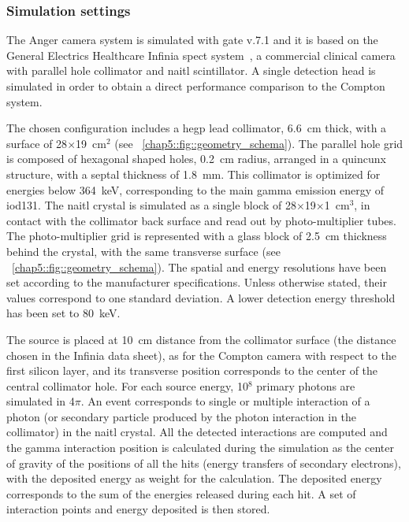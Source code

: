 \subsubsection{Simulation settings}\label{chap5::subsubsec::AC_settings}
The Anger camera system is simulated with \gls{gate} v.7.1 and it is based on the General Electrics Healthcare Infinia \gls{spect} system~\parencite{GeneralElectrics2006}, a commercial clinical camera with parallel hole collimator and \gls{naitl} scintillator. A single detection head is simulated in order to obtain a direct performance comparison to the Compton system.

The chosen configuration includes a \gls{hegp} lead collimator, 6.6~cm thick, with a surface of 28$\times$19~cm$^{2}$ (see \figurename~\ref{chap5::fig::geometry_schema}). The parallel hole grid is composed of hexagonal shaped holes, 0.2~cm radius, arranged in a quincunx structure, with a septal thickness of 1.8~mm. This collimator is optimized for energies below 364~keV, corresponding to the main gamma emission energy of \gls{iod131}. The \gls{naitl} crystal is simulated as a single block of 28$\times$19$\times$1~cm$^{3}$, in contact with the collimator back surface and read out by photo-multiplier tubes. The photo-multiplier grid is represented with a glass block of 2.5~cm thickness behind the crystal, with the same transverse surface (see \figurename~\ref{chap5::fig::geometry_schema}). The spatial and energy resolutions have been set according to the manufacturer specifications. Unless otherwise stated, their values correspond to one standard deviation. A lower detection energy threshold has been set to 80~keV.

The source is placed at 10~cm distance from the collimator surface (the distance chosen in the Infinia data sheet), as for the Compton camera with respect to the first silicon layer, and its transverse position corresponds to the center of the central collimator hole. For each source energy, 10$^{8}$ primary photons are simulated in 4$\pi$. An event corresponds to single or multiple interaction of a photon (or secondary particle produced by the photon interaction in the collimator) in the \gls{naitl} crystal. All the detected interactions are computed and the gamma interaction position is calculated during the simulation as the center of gravity of the positions of all the hits (energy transfers of secondary electrons), with the deposited energy as weight for the calculation. The deposited energy corresponds to the sum of the energies released during each hit. A set of interaction points and energy deposited is then stored. 

